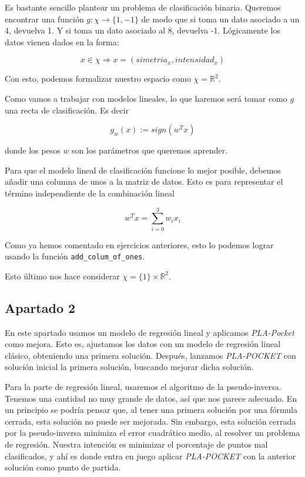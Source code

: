 \documentclass[11pt]{article}
\begin{document}
Es bastante sencillo plantear un problema de clasificación binaria. Queremos encontrar una función $g: \chi \rightarrow \{1, -1\}$ de modo que si toma un dato asociado a un 4, devuelva 1. Y si toma un dato asociado al 8, devuelva -1. Lógicamente los datos vienen dados en la forma:

$$x \in \chi \Rightarrow x = (simetria_x, intensidad_x)$$

Con esto, podemos formalizar nuestro espacio como $\chi = \mathbb{R}^2$.

Como vamos a trabajar con modelos lineales, lo que haremos será tomar como $g$ una recta de clasificación. Es decir

$$g_w(x) := sign(w^T x)$$

donde los pesos $w$ son los parámetros que queremos aprender.

Para que el modelo lineal de clasificación funcione lo mejor posible, debemos añadir una columna de unos a la matriz de datos. Esto es para representar el término independiente de la combinación lineal

$$w^T x = \sum_{i = 0}^{3} w_i x_i$$

Como ya hemos comentado en ejercicios anteriores, esto lo podemos lograr usando la función \lstinline{add_colum_of_ones}.

Esto último nos hace considerar $\chi = \{1\} \times \mathbb{R}^2$.

\subsection{Apartado 2}

En este apartado usamos un modelo de regresión lineal y aplicamos \emph{PLA-Pocket} como mejora. Esto es, ajustamos los datos con un modelo de regresión lineal clásico, obteniendo una primera solución. Después, lanzamos \emph{PLA-POCKET} con solución inicial la primera solución, buscando mejorar dicha solución.

Para la parte de regresión lineal, usaremos el algoritmo de la pseudo-inversa. Tenemos una cantidad no muy grande de datos, así que nos parece adecuado. En un principio se podría pensar que, al tener una primera solución por una fórmula cerrada, esta solución no puede ser mejorada. Sin embargo, esta solución cerrada por la pseudo-inversa minimiza el error cuadrático medio, al resolver un problema de regresión. Nuestra intención es minimizar el porcentaje de puntos mal clasificados, y ahí es donde entra en juego aplicar \emph{PLA-POCKET} con la anterior solución como punto de partida.
\end{document}
